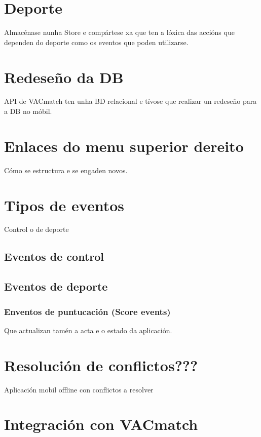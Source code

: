   \section{Deporte}
  Almacénase nunha Store e compártese xa que ten a lóxica das accións que dependen do 
deporte como os eventos que poden utilizarse.
  
  \section{Redeseño da DB}
  API de VACmatch ten unha BD relacional e tívose que realizar un redeseño para a DB no 
móbil.
  
  \section{Enlaces do menu superior dereito}
  Cómo se estructura e se engaden novos.

  \section{Tipos de eventos}
  Control o de deporte
    \subsection{Eventos de control}
    \subsection{Eventos de deporte}
      \subsubsection{Enventos de puntucación (Score events)}
      Que actualizan tamén a acta e o estado da aplicación.

  \section{Resolución de conflictos???}
  Aplicación mobil offline con conflictos a resolver

  \section{Integración con VACmatch}